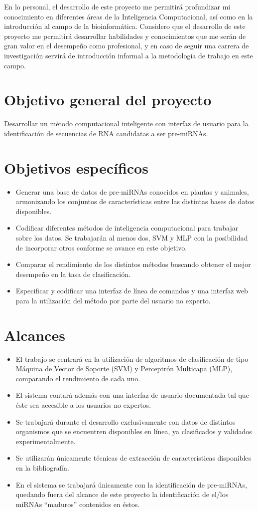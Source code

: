 \documentclass[12pt,bibliography=oldstyle,DIV=12,parskip=full-,titlepage]{scrartcl}
\begin{document}
En lo personal, el desarrollo de este proyecto me permitirá
profundizar mi conocimiento en diferentes áreas de la Inteligencia
Computacional, así como en la introducción al campo de la
bioinformática. Considero que el desarrollo de este proyecto me
permitirá desarrollar habilidades y conocimientos que me serán de gran
valor en el desempeño como profesional, y en caso de seguir una
carrera de investigación servirá de introducción informal a la
metodología de trabajo en este campo.
%
%
\newpage
\section{Objetivo general del proyecto}
Desarrollar un método computacional inteligente con interfaz de
usuario para la identificación de secuencias de RNA candidatas a ser
pre-miRNAs.
\section{Objetivos específicos}
\begin{itemize}
\item Generar una base de datos de pre-miRNAs conocidos en plantas y
  animales, armonizando los conjuntos de características entre las
  distintas bases de datos disponibles.
\item Codificar diferentes métodos de inteligencia computacional para
  trabajar sobre los datos. Se trabajarán al menos dos, SVM y MLP con
  la posibilidad de incorporar otros conforme se avance en este
  objetivo.
\item Comparar el rendimiento de los distintos métodos buscando
  obtener el mejor desempeño en la tasa de clasificación.
\item Especificar y codificar una interfaz de línea de comandos y una
  interfaz web para la utilización del método por parte del usuario no experto.
\end{itemize}
%
%
\section{Alcances}
\begin{itemize}
\item El trabajo se centrará en la utilización de algoritmos de
  clasificación de tipo Máquina de Vector de Soporte (SVM) y
  Perceptrón Multicapa (MLP), comparando el rendimiento de cada uno.
\item El sistema contará además con una interfaz de usuario
  documentada tal que éste sea accesible a los usuarios no expertos.
\item Se trabajará durante el desarrollo exclusivamente con datos de
  distintos organismos que se encuentren disponibles en línea, ya
  clasificados y validados experimentalmente.
\item Se utilizarán únicamente técnicas de extracción de
  características disponibles en la bibliografía.
\item En el sistema se trabajará únicamente con la identificación de
  pre-miRNAs, quedando fuera del alcance de este proyecto la
  identificación de el/los miRNAs ``maduros'' contenidos en éstos.
\end{itemize}
%
%
\end{document}
